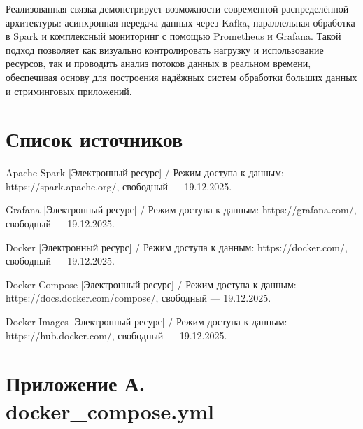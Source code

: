\documentclass[14pt,a4paper]{extarticle}
\begin{document}
Реализованная связка демонстрирует возможности современной распределённой
архитектуры: асинхронная передача данных через Kafka, параллельная обработка в
Spark и комплексный мониторинг с помощью Prometheus и Grafana. Такой подход
позволяет как визуально контролировать нагрузку и использование ресурсов, так и
проводить анализ потоков данных в реальном времени, обеспечивая основу для
построения надёжных систем обработки больших данных и стриминговых приложений.

\newpage
\section{Список источников}

\begin{enumerate}
        \begin{sloppypar}
        \item Apache Spark [Электронный ресурс] /
            Режим доступа к данным: https://spark.apache.org/,
            свободный — 19.12.2025.

        \item Grafana [Электронный ресурс] /
            Режим доступа к данным: https://grafana.com/,
            свободный — 19.12.2025.

        \item Docker [Электронный ресурс] /
            Режим доступа к данным: https://docker.com/,
            свободный — 19.12.2025.

        \item Docker Compose [Электронный ресурс] /
            Режим доступа к данным: https://docs.docker.com/compose/,
            свободный — 19.12.2025.

        \item Docker Images [Электронный ресурс] /
            Режим доступа к данным: https://hub.docker.com/,
            свободный — 19.12.2025.
        \end{sloppypar}
\end{enumerate}

\newpage
\section*{Приложение А. docker\_compose.yml}
\end{document}
